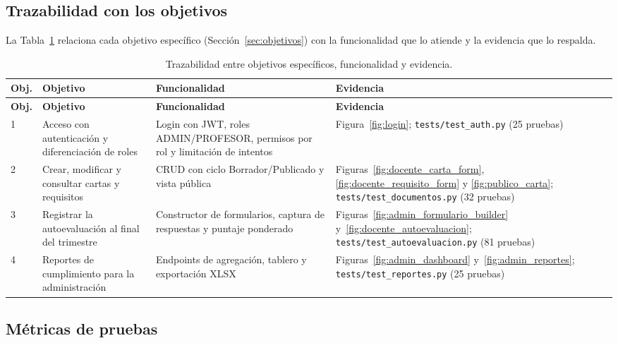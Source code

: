 \subsection{Trazabilidad con los objetivos}

La Tabla~\ref{tab:trazabilidad} relaciona cada objetivo específico (Sección~\ref{sec:objetivos}) con la funcionalidad que lo atiende y la evidencia que lo respalda.

\begin{longtable}{p{} p{} p{} p{}}
    \caption{Trazabilidad entre objetivos específicos, funcionalidad y evidencia.}
    \label{tab:trazabilidad}\\
    \toprule
    \textbf{Obj.} & \textbf{Objetivo} & \textbf{Funcionalidad} & \textbf{Evidencia} \\
    \midrule
    \endfirsthead

    \toprule
    \textbf{Obj.} & \textbf{Objetivo} & \textbf{Funcionalidad} & \textbf{Evidencia} \\
    \midrule
    \endhead

    1 & Acceso con autenticación y diferenciación de roles & Login con JWT, roles ADMIN/PROFESOR, permisos por rol y limitación de intentos & Figura~\ref{fig:login}; \texttt{tests/test\_auth.py} (25 pruebas) \\
    \midrule
    2 & Crear, modificar y consultar cartas y requisitos & CRUD con ciclo Borrador/Publicado y vista pública & Figuras~\ref{fig:docente_carta_form}, \ref{fig:docente_requisito_form} y \ref{fig:publico_carta}; \texttt{tests/test\_documentos.py} (32 pruebas) \\
    \midrule
    3 & Registrar la autoevaluación al final del trimestre & Constructor de formularios, captura de respuestas y puntaje ponderado & Figuras~\ref{fig:admin_formulario_builder} y~\ref{fig:docente_autoevaluacion}; \texttt{tests/test\_autoevaluacion.py} (81 pruebas) \\
    \midrule
    4 & Reportes de cumplimiento para la administración & Endpoints de agregación, tablero y exportación XLSX & Figuras~\ref{fig:admin_dashboard} y~\ref{fig:admin_reportes}; \texttt{tests/test\_reportes.py} (25 pruebas) \\
    \bottomrule
\end{longtable}

\subsection{Métricas de pruebas}

